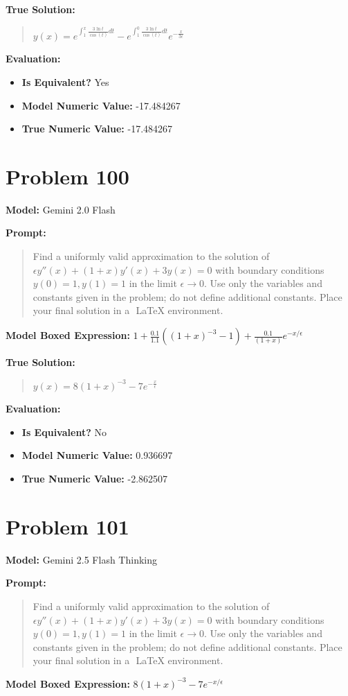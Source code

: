 \documentclass{article}
\begin{document}
{\textbf{True Solution:}
\begin{quote}
$y(x) = e^{\int_{1}^{x}\frac{3\ln t}{\cos(t)}dt} - e^{\int_{1}^{0}\frac{3\ln t}{\cos(t)}dt}e^{- \frac{x}{3\epsilon}}$
\end{quote}

\textbf{Evaluation:}
\begin{itemize}
\item \textbf{Is Equivalent?} Yes
\item \textbf{Model Numeric Value:} -17.484267
\item \textbf{True Numeric Value:} -17.484267
\end{itemize}
\vspace{1cm}
\section*{Problem 100}
\textbf{Model:} Gemini 2.0 Flash

\textbf{Prompt:}
\begin{quote}
Find a uniformly valid approximation to the solution of $\epsilon y''(x) + (1 + x) y'(x) + 3 y(x) = 0$ with boundary conditions $y(0) = 1, y(1) = 1$ in the limit $\epsilon \to 0$. Use only the variables and constants given in the problem; do not define additional constants. Place your final solution in a $\boxed{}$ LaTeX environment.
\end{quote}
\textbf{Model Boxed Expression:} $1 + \frac{0.1}{1.1} \left( (1+x)^{-3} - 1 \right) + \frac{0.1}{(1+x)} e^{-x/\epsilon}$

\textbf{True Solution:}
\begin{quote}
$y(x)=8(1+x)^{-3}-7e^{-\frac{x}{\epsilon}}$
\end{quote}

\textbf{Evaluation:}
\begin{itemize}
\item \textbf{Is Equivalent?} No
\item \textbf{Model Numeric Value:} 0.936697
\item \textbf{True Numeric Value:} -2.862507
\end{itemize}
\vspace{1cm}
\section*{Problem 101}
\textbf{Model:} Gemini 2.5 Flash Thinking

\textbf{Prompt:}
\begin{quote}
Find a uniformly valid approximation to the solution of $\epsilon y''(x) + (1 + x) y'(x) + 3 y(x) = 0$ with boundary conditions $y(0) = 1, y(1) = 1$ in the limit $\epsilon \to 0$. Use only the variables and constants given in the problem; do not define additional constants. Place your final solution in a $\boxed{}$ LaTeX environment.
\end{quote}
\textbf{Model Boxed Expression:} $8(1+x)^{-3} - 7e^{-x/\epsilon}$

}
\end{document}
